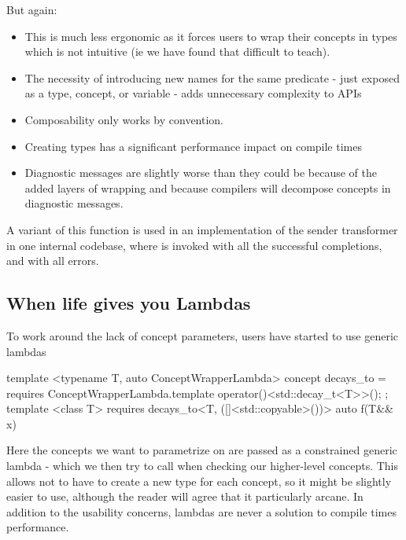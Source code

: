 \documentclass{wg21}
\begin{document}
But again:
\begin{itemize}
\item This is much less ergonomic as it forces users to wrap their concepts in types which is not intuitive (ie we have found that difficult to teach).
\item The necessity of introducing new names for the same predicate - just exposed as a type, concept, or variable - adds unnecessary complexity to APIs
\item Composability only works by convention.
\item Creating types has a significant performance impact on compile times
\item Diagnostic messages are slightly worse than they could be because of the added layers of wrapping and because compilers will decompose concepts in diagnostic messages.
\end{itemize}

A variant of this function is used in an implementation of the  sender transformer in one internal codebase,
where  is invoked with all the successful completions, and  with all errors.


\subsection{When life gives you Lambdas}

To work around the lack of concept parameters, users have started to use generic lambdas

\begin{colorblock}
template <typename T, auto ConceptWrapperLambda>
concept decays_to = requires {
    ConceptWrapperLambda.template operator()<std::decay_t<T>>();
};
template <class T>
requires decays_to<T, ([]<std::copyable>(){})>
auto f(T&& x) {}
\end{colorblock}

Here the concepts we want to parametrize on are passed as a constrained generic lambda - which we then try to call when checking our higher-level concepts.
This allows not to have to create a new type for each concept, so it might be slightly easier to use, although the reader will agree that it particularly arcane.
In addition to the usability concerns, lambdas are never a solution to compile times performance.
\end{document}

